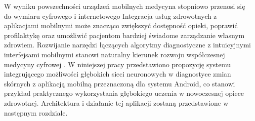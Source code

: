 W wyniku powszechności urządzeń mobilnych medycyna stopniowo przenosi się do wymiaru cyfrowego i internetowego
Integracja usług zdrowotnych z aplikacjami mobilnymi może znacząco zwiększyć dostępność opieki, poprawić profilaktykę oraz umożliwić pacjentom bardziej świadome zarządzanie własnym zdrowiem.
Rozwijanie narzędzi łączących algorytmy diagnostyczne z intuicyjnymi interfejsami mobilnymi stanowi naturalny kierunek rozwoju współczesnej medycyny cyfrowej \cite{Ajisafe_2020, Bourouis_Zerdazi_Feham_Bouchachia_2013, jamadermatol}.
W niniejszej pracy przedstawiono propozycję systemu integrującego możliwości głębokich sieci neuronowych w diagnostyce zmian skórnych z aplikacją mobilną przeznaczoną dla systemu Android, co stanowi przykład praktycznego wykorzystania głębokiego uczenia w nowoczesnej opiece zdrowotnej.
Architektura i działanie tej aplikacji zostaną przedstawione w następnym rozdziale.
